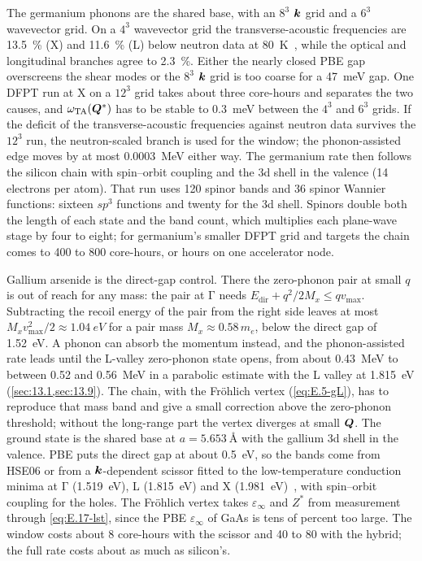 The germanium phonons are the shared base, with an $8^3$ $\bm{k}$ grid and a $6^3$ wavevector grid. On a $4^3$ wavevector grid the transverse-acoustic frequencies are \SI{13.5}{\percent} (X) and \SI{11.6}{\percent} (L) below neutron data at \SI{80}{K}~\cite{nilsson1971phonon}, while the optical and longitudinal branches agree to \SI{2.3}{\percent}. Either the nearly closed PBE gap overscreens the shear modes or the $8^3$ $\bm{k}$ grid is too coarse for a \SI{47}{meV} gap. One DFPT run at X on a $12^3$ grid takes about three core-hours and separates the two causes, and $\omega_{\mathrm{TA}}(\bm{Q}^*)$ has to be stable to \SI{0.3}{meV} between the $4^3$ and $6^3$ grids. If the deficit of the transverse-acoustic frequencies against neutron data survives the $12^3$ run, the neutron-scaled branch is used for the window; the phonon-assisted edge moves by at most \SI{0.0003}{MeV} either way. The germanium rate then follows the silicon chain with spin--orbit coupling and the 3d shell in the valence (14 electrons per atom). That run uses 120 spinor bands and 36 spinor Wannier functions: sixteen $sp^3$ functions and twenty for the 3d shell. Spinors double both the length of each state and the band count, which multiplies each plane-wave stage by four to eight; for germanium's smaller DFPT grid and targets the chain comes to 400 to 800 core-hours, or hours on one accelerator node.

Gallium arsenide is the direct-gap control. There the zero-phonon pair at small $q$ is out of reach for any mass: the pair at $\mathrm{\Gamma}$ needs $E_{\mathrm{dir}} + q^2/2M_x \le qv_{\mathrm{max}}$. Subtracting the recoil energy of the pair from the right side leaves at most $M_xv_{\mathrm{max}}^2/2 \approx \SI{1.04}{eV}$ for a pair mass $M_x \approx 0.58\,m_e$, below the direct gap of \SI{1.52}{eV}. A phonon can absorb the momentum instead, and the phonon-assisted rate leads until the L-valley zero-phonon state opens, from about \SI{0.43}{MeV} to between 0.52 and \SI{0.56}{MeV} in a parabolic estimate with the L valley at \SI{1.815}{eV} (\cref{sec:13.1,sec:13.9}). The chain, with the Fr\"ohlich vertex (\cref{eq:E.5-gL}), has to reproduce that mass band and give a small correction above the zero-phonon threshold; without the long-range part the vertex diverges at small $\bm{Q}$. The ground state is the shared base at $a = \SI{5.653}{\angstrom}$ with the gallium 3d shell in the valence. PBE puts the direct gap at about \SI{0.5}{eV}, so the bands come from HSE06 or from a $\bm{k}$-dependent scissor fitted to the low-temperature conduction minima at $\mathrm{\Gamma}$ (\SI{1.519}{eV}), L (\SI{1.815}{eV}) and X (\SI{1.981}{eV})~\cite{vurgaftman2001band}, with spin--orbit coupling for the holes. The Fr\"ohlich vertex takes $\varepsilon_\infty$ and $Z^*$ from measurement through \cref{eq:E.17-lst}, since the PBE $\varepsilon_\infty$ of GaAs is tens of percent too large. The window costs about 8 core-hours with the scissor and 40 to 80 with the hybrid; the full rate costs about as much as silicon's.

